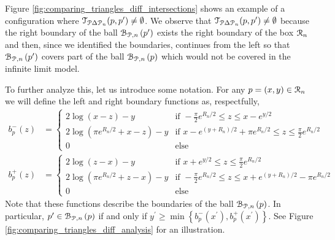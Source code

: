 Figure \ref{fig:comparing_triangles_diff_intersections} shows an example of a configuration where $\mathcal{T}_{{\mathcal P} \Delta {\mathcal P}_n}(p,p^\prime) \ne \emptyset$. We observe that $\mathcal{T}_{{\mathcal P} \Delta {\mathcal P}_n}(p,p^\prime) \ne \emptyset$ because the right boundary of the ball ${\mathcal B}_{{\mathcal P},n}\left(p^\prime\right)$ exists the right boundary of the box ${\mathcal R}_n$ and then, since we identified the boundaries, continues from the left so that ${\mathcal B}_{{\mathcal P},n}\left(p^\prime\right)$ covers part of the ball ${\mathcal B}_{{\mathcal P},n}\left(p\right)$ which would not be covered in the infinite limit model. 

To further analyze this, let us introduce some notation. For any $p = (x,y) \in {\mathcal R}_n$ we will define the left and right boundary functions as, respectfully,
\begin{align}
	b_p^-(z) &= \begin{cases}
		2 \log\left(x-z\right) - y &\mbox{if }  -\frac{\pi}{2} e^{R_n/2} \le z \le x - e^{y/2}  \\
		2\log\left(\pi e^{R_n/2} + x - z\right) - y 
			&\mbox{if } x - e^{(y + R_n)/2} + \pi e^{R_n/2} \le z \le \frac{\pi}{2} e^{R_n/2}\\
		0 &\mbox{else}
	\end{cases}\\
	b_p^+(z) &= \begin{cases}
		2 \log\left(z-x\right) - y &\mbox{if } x + e^{y/2} \le z \le \frac{\pi}{2} e^{R_n/2} \\
		2\log\left(\pi e^{R_n/2} + z - x\right) - y 
			&\mbox{if } -\frac{\pi}{2} e^{R_n/2} \le z \le x + e^{(y + R_n)/2} - \pi e^{R_n/2}\\
		0 &\mbox{else}
	\end{cases}
\end{align}
Note that these functions describe the boundaries of the ball ${\mathcal B}_{{\mathcal P},n}\left(p\right)$. In particular, $p^\prime \in {\mathcal B}_{{\mathcal P},n}\left(p\right)$ if and only if $y^\prime \ge \min\left\{b_p^-(x^\prime), b_p^+(x^\prime)\right\}$. See Figure \ref{fig:comparing_triangles_diff_analysis} for an illustration.

